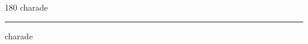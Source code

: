 
\begin{frame}
\begin{center}
\begin{turn}{180}
{\fontsize{2.5cm}{1em}\selectfont charade}
\end{turn}
\vspace{1em}\par  
\hrule
\vspace{1em}\par  
{\fontsize{2.5cm}{1em}\selectfont charade}
\end{center}
\end{frame}
